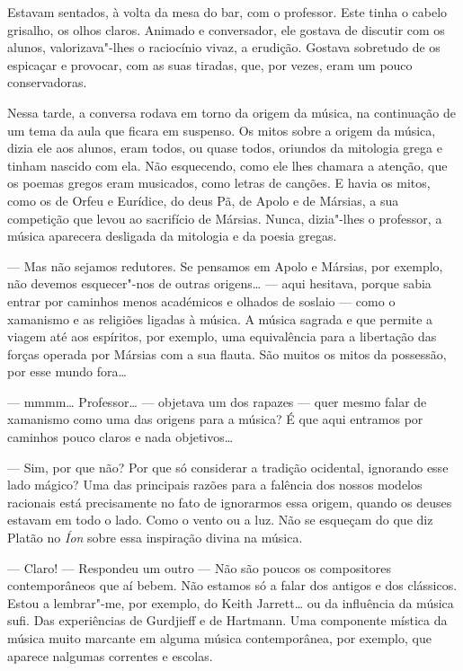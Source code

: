 Estavam sentados, à volta da mesa do bar, com o professor. Este tinha o
cabelo grisalho, os olhos claros. Animado e conversador, ele gostava de
discutir com os alunos, valorizava"-lhes o raciocínio vivaz, a erudição.
Gostava sobretudo de os espicaçar e provocar, com as suas tiradas, que,
por vezes, eram um pouco conservadoras.

Nessa tarde, a conversa rodava em torno da origem da música, na
continuação de um tema da aula que ficara em suspenso. Os mitos sobre a
origem da música, dizia ele aos alunos, eram todos, ou quase todos,
oriundos da mitologia grega e tinham nascido com ela. Não esquecendo,
como ele lhes chamara a atenção, que os poemas gregos eram musicados,
como letras de canções. E havia os mitos, como os de Orfeu e Eurídice,
do deus Pã, de Apolo e de Mársias, a sua competição que levou ao
sacrifício de Mársias. Nunca, dizia"-lhes o professor, a música aparecera
desligada da mitologia e da poesia gregas.

--- Mas não sejamos redutores. Se pensamos em Apolo e Mársias, por
exemplo, não devemos esquecer"-nos de outras origens\ldots{} --- aqui
hesitava, porque sabia entrar por caminhos menos académicos e olhados de
soslaio --- como o xamanismo e as religiões ligadas à música. A música
sagrada e que permite a viagem até aos espíritos, por exemplo, uma
equivalência para a libertação das forças operada por Mársias com a sua
flauta. São muitos os mitos da possessão, por esse mundo fora\ldots{}

--- mmmm\ldots{} Professor\ldots{} --- objetava um dos rapazes --- quer mesmo
falar de xamanismo como uma das origens para a música? É que aqui
entramos por caminhos pouco claros e nada objetivos\ldots{}

--- Sim, por que não? Por que só considerar a tradição ocidental, ignorando
esse lado mágico? Uma das principais razões para a falência dos nossos
modelos racionais está precisamente no fato de ignorarmos essa origem,
quando os deuses estavam em todo o lado. Como o vento ou a luz. Não se
esqueçam do que diz Platão no \emph{Íon }sobre essa inspiração divina na
música.

--- Claro! --- Respondeu um outro --- Não são poucos os compositores
contemporâneos que aí bebem. Não estamos só a falar dos antigos e dos
clássicos. Estou a lembrar"-me, por exemplo, do Keith Jarrett\ldots{} ou
da influência da música sufi. Das experiências de Gurdjieff e de
Hartmann. Uma componente mística da música muito marcante em alguma
música contemporânea, por exemplo, que aparece nalgumas correntes e
escolas.

